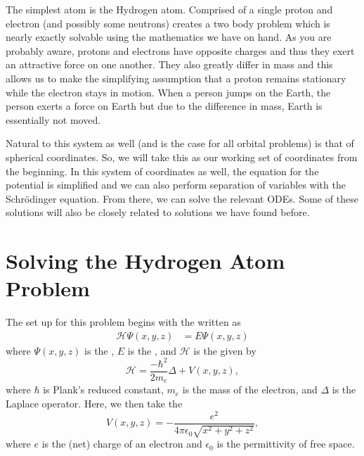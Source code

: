 \documentclass{article}
\newcommand{\hamiltonian}{\mathcal{H}}
\begin{document}
The simplest atom is the Hydrogen atom.  Comprised of a single proton and electron (and possibly some neutrons) creates a two body problem which is nearly exactly solvable using the mathematics we have on hand.  As you are probably aware, protons and electrons have opposite charges and thus they exert an attractive force on one another.  They also greatly differ in mass and this allows us to make the simplifying assumption that a proton remains stationary while the electron stays in motion.  When a person jumps on the Earth, the person exerts a force on Earth but due to the difference in mass, Earth is essentially not moved.

Natural to this system as well (and is the case for all orbital problems) is that of spherical coordinates.  So, we will take this as our working set of coordinates from the beginning.  In this system of coordinates as well, the equation for the potential is simplified and we can also perform separation of variables with the Schr\"odinger equation.  From there, we can solve the relevant ODEs.  Some of these solutions will also be closely related to solutions we have found before. 

\section{Solving the Hydrogen Atom Problem}
The set up for this problem begins with the  written as
\begin{align*}
    \hamiltonian\Psi(x,y,z) &= E \Psi(x,y,z)
\end{align*}
where $\Psi(x,y,z)$ is the , $E$ is the , and $\hamiltonian$ is the  given by
\[
\hamiltonian= \frac{-\hbar^2}{2m_e}\Delta + V(x,y,z),
\]
where $\hbar$ is Plank's reduced constant, $m_e$ is the mass of the electron, and $\Delta$ is the Laplace operator. Here, we then take the  
\[
V(x,y,z) = -\frac{e^2}{4\pi \epsilon_0 \sqrt{x^2+y^2 + z^2} },
\]
where $e$ is the (net) charge of an electron and $\epsilon_0$ is the permittivity of free space. 
\end{document}

